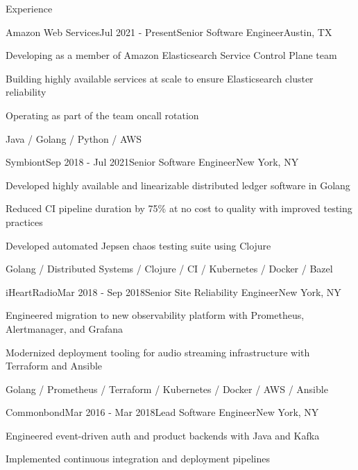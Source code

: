 \documentclass{resume} %
\begin{document}
\begin{rSection}{Experience}

\begin{rSubsection}{Amazon Web Services}{Jul 2021 - Present}{Senior Software Engineer}{Austin, TX}
\item Developing as a member of Amazon Elasticsearch Service Control Plane team
\item Building highly available services at scale to ensure Elasticsearch cluster reliability
\item Operating as part of the team oncall rotation

Java / Golang / Python / AWS
\end{rSubsection}

\begin{rSubsection}{Symbiont}{Sep 2018 - Jul 2021}{Senior Software Engineer}{New York, NY}
\item Developed highly available and linearizable distributed ledger software in Golang
\item Reduced CI pipeline duration by 75\% at no cost to quality with improved testing practices
\item Developed automated Jepsen chaos testing suite using Clojure

Golang / Distributed Systems / Clojure / CI / Kubernetes / Docker / Bazel
\end{rSubsection}


\begin{rSubsection}{iHeartRadio}{Mar 2018 - Sep 2018}{Senior Site Reliability Engineer}{New York, NY}
\item Engineered migration to new observability platform with Prometheus, Alertmanager, and Grafana
\item Modernized deployment tooling for audio streaming infrastructure with Terraform and Ansible

Golang / Prometheus / Terraform / Kubernetes / Docker / AWS / Ansible
\end{rSubsection}


\begin{rSubsection}{Commonbond}{Mar 2016 - Mar 2018}{Lead Software Engineer}{New York, NY}
\item Engineered event-driven auth and product backends with Java and Kafka
\item Implemented continuous integration and deployment pipelines


\end{rSubsection}
\end{rSection}
\end{document}
